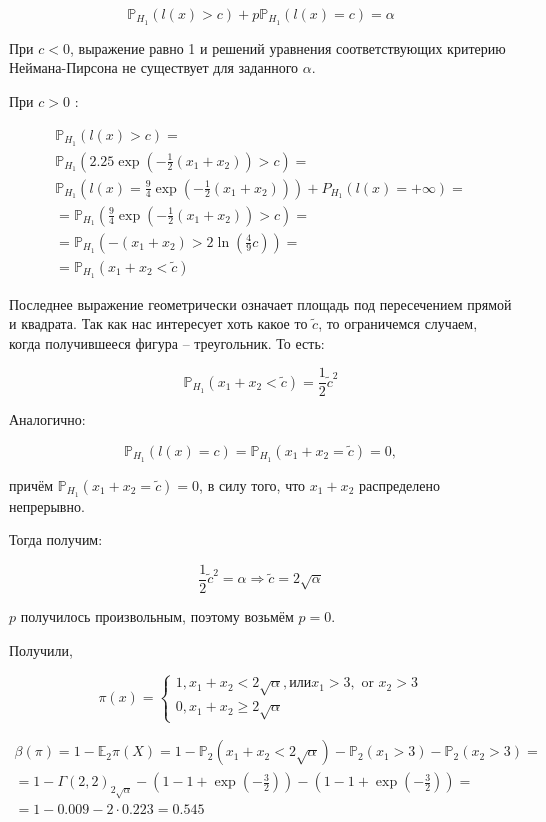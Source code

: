 \documentclass[14pt]{extarticle}
\begin{document}
\begin{equation*}
    \mathbb P_{H_1}(l(x) > c) + p\mathbb P_{H_1}(l(x) = c) = \alpha
\end{equation*}

При $c<0$, выражение равно 1 и решений уравнения соответствующих критерию Неймана-Пирсона не существует для заданного $\alpha$. 

При $c>0$ :

\begin{gather*}
\mathbb{P}_{H_{1}}(l(x)>c)= \\
\mathbb{P}_{H_{1}}\left(2.25 \exp \left(-\frac{1}{2}\left(x_{1}+x_{2}\right)\right)>c\right) = \\
\mathbb{P}_{H_{1}}\left(l(x)=\frac{9}{4} \exp \left(-\frac{1}{2}\left(x_{1}+x_{2}\right)\right)\right)+P_{H_{1}}(l(x)=+\infty)= \\
=\mathbb{P}_{H_{1}}\left(\frac{9}{4} \exp \left(-\frac{1}{2}\left(x_{1}+x_{2}\right)\right)>c\right)= \\
=\mathbb{P}_{H_{1}}\left(-\left(x_{1}+x_{2}\right)>2 \ln \left(\frac{4}{9} c\right)\right)= \\
=\mathbb{P}_{H_{1}}\left(x_{1}+x_{2}<\tilde{c}\right)
\end{gather*}

Последнее выражение геометрически означает площадь под пересечением прямой и квадрата. Так как нас интересует хоть какое то $\tilde{c}$, то ограничемся случаем, когда получившееся фигура -- треугольник. То есть:

$$
\mathbb{P}_{H_{1}}\left(x_{1}+x_{2}<\tilde{c}\right)=\frac{1}{2} \tilde{c}^{2}
$$

Аналогично:

$$
\mathbb{P}_{H_{1}}(l(x)=c)=\mathbb{P}_{H_{1}}\left(x_{1}+x_{2}=\tilde{c}\right)=0,
$$

причём $\mathbb{P}_{H_{1}}\left(x_{1}+x_{2}=\tilde{c}\right)=0$, в силу того, что $x_{1}+x_{2}$ распределено непрерывно.

Тогда получим:

$$
\frac{1}{2} \tilde{c}^{2}=\alpha \Longrightarrow \tilde{c}=2 \sqrt{\alpha}
$$

$p$ получилось произвольным, поэтому возьмём $p=0$.

Получили, 

\begin{equation*}
    \pi(x) = 
    \begin{cases}
        1, x_{1}+x_{2}<2 \sqrt{\alpha}, \text {или} x_{1}>3, \text { or } x_{2}>3\\
        0, x_{1}+x_{2} \geq 2 \sqrt{\alpha}
    \end{cases}
\end{equation*}

\begin{gather*}
\beta(\pi)=1-\mathbb{E}_{2} \pi(X)=1-\mathbb{P}_{2}\left(x_{1}+x_{2}<2 \sqrt{\alpha}\right)-\mathbb{P}_{2}\left(x_{1}>3\right)-\mathbb{P}_{2}\left(x_{2}>3\right)= \\
=1-\Gamma(2,2)_{2 \sqrt{\alpha}}-\left(1-1+\exp \left(-\frac{3}{2}\right)\right)-\left(1-1+\exp \left(-\frac{3}{2}\right)\right)= \\
=1-0.009-2 \cdot 0.223=0.545
\end{gather*}
\end{document}
